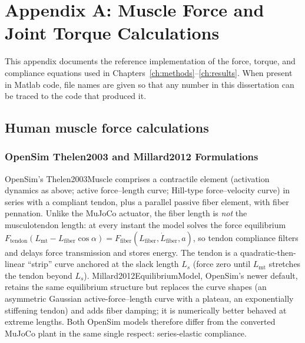 \chapter{Appendix A: Muscle Force and Joint Torque Calculations}\label{app:muscle_calcs}

This appendix documents the reference implementation of the force, torque, and compliance equations used in Chapters~\ref{ch:methods}--\ref{ch:results}. When present in Matlab code, file names are given so that any number in this dissertation can be traced to the code that produced it.

\section{Human muscle force calculations}
\subsection{OpenSim Thelen2003 and Millard2012 Formulations}

OpenSim's Thelen2003Muscle comprises a contractile element (activation
dynamics as above; active force--length curve; Hill-type force--velocity
curve) in series with a compliant tendon, plus a parallel passive fiber
element, with fiber pennation. Unlike the MuJoCo actuator, the fiber
length is \emph{not} the musculotendon length: at every instant the
model solves the force equilibrium
$F_{\text{tendon}}(L_{\text{mt}} - L_{\text{fiber}}\cos\alpha)
 = F_{\text{fiber}}(L_{\text{fiber}}, \dot{L}_{\text{fiber}}, a)$,
so tendon compliance filters and delays force transmission and stores
energy. The tendon is a quadratic-then-linear ``strip'' curve anchored
at the slack length $L_s$ (force zero until $L_{\text{mt}}$ stretches
the tendon beyond $L_s$). Millard2012EquilibriumModel, OpenSim's newer
default, retains the same equilibrium structure but replaces the curve
shapes (an asymmetric Gaussian active-force--length curve with a
plateau, an exponentially stiffening tendon) and adds fiber damping; it
is numerically better behaved at extreme lengths. Both OpenSim models
therefore differ from the converted MuJoCo plant in the same single
respect: series-elastic compliance.

